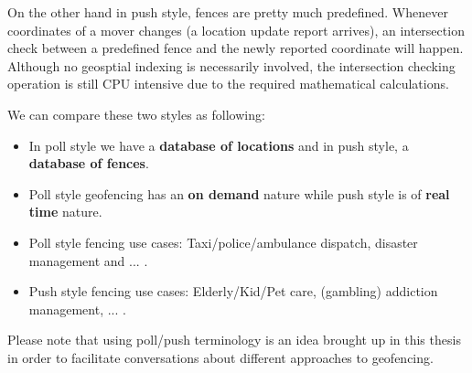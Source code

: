 \documentclass[a4]{report}
\begin{document}
        On the other hand in push style, fences are pretty much predefined.
        Whenever coordinates of a mover changes (a location update report arrives), an intersection check between a
        predefined fence and the newly reported coordinate will happen.
        Although no geosptial indexing is necessarily involved, the intersection checking operation is still CPU
        intensive due to the required mathematical calculations.

        We can compare these two styles as following:
        \begin{itemize}
            \item In poll style we have a \textbf{database of locations} and in push style, a \textbf{database of fences}.
            \item Poll style geofencing has an \textbf{on demand} nature while push style is of \textbf{real time} nature.
            \item Poll style fencing use cases: Taxi/police/ambulance dispatch, disaster management and ... .
            \item Push style fencing use cases: Elderly/Kid/Pet care, (gambling) addiction management, ... .
        \end{itemize}

        Please note that using poll/push terminology is an idea brought up in this thesis in order to facilitate
        conversations about different approaches to geofencing.
\end{document}
